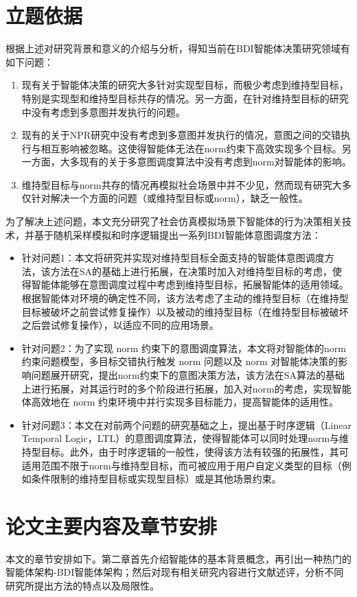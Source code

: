 \section{立题依据}
根据上述对研究背景和意义的介绍与分析，得知当前在BDI智能体决策研究领域有如下问题：
\begin{enumerate}
  \item 现有关于智能体决策的研究大多针对实现型目标，而极少考虑到维持型目标，特别是实现型和维持型目标共存的情况。另一方面，在针对维持型目标的研究中没有考虑到多意图并发执行的问题。
  \item 现有的关于NPR研究中没有考虑到多意图并发执行的情况，意图之间的交错执行与相互影响被忽略。这使得智能体无法在norm约束下高效实现多个目标。另一方面，大多现有的关于多意图调度算法中没有考虑到norm对智能体的影响。
  \item 维持型目标与norm共存的情况再模拟社会场景中并不少见，然而现有研究大多仅针对解决一个方面的问题（或维持型目标或norm），缺乏一般性。
\end{enumerate}

%
为了解决上述问题，本文充分研究了社会仿真模拟场景下智能体的行为决策相关技术，并基于随机采样模拟和时序逻辑提出一系列BDI智能体意图调度方法：
\begin{itemize}
  \item
针对问题1：本文将研究并实现对维持型目标全面支持的智能体意图调度方法，该方法在SA的基础上进行拓展，在决策时加入对维持型目标的考虑，使得智能体能够在意图调度过程中考虑到维持型目标，拓展智能体的适用领域。根据智能体对环境的确定性不同，该方法考虑了主动的维持型目标（在维持型目标被破坏之前尝试修复操作）以及被动的维持型目标（在维持型目标被破坏之后尝试修复操作），以适应不同的应用场景。
  \item
针对问题2：为了实现 norm 约束下的意图调度算法，本文将对智能体的norm约束问题模型，多目标交错执行触发 norm 问题以及 norm 对智能体决策的影响问题展开研究，提出norm约束下的意图决策方法，该方法在SA算法的基础上进行拓展，对其运行时的多个阶段进行拓展，加入对norm的考虑，实现智能体高效地在 norm 约束环境中并行实现多目标能力，提高智能体的适用性。
  \item
针对问题3：本文在对前两个问题的研究基础之上，提出基于时序逻辑（Linear Temporal Logic，LTL）的意图调度算法，使得智能体可以同时处理norm与维持型目标。此外，由于时序逻辑的一般性，使得该方法有较强的拓展性，其可适用范围不限于norm与维持型目标，而可被应用于用户自定义类型的目标（例如条件限制的维持型目标或实现型目标）或是其他场景约束。
\end{itemize}
%
\section{论文主要内容及章节安排}
本文的章节安排如下。第二章首先介绍智能体的基本背景概念，再引出一种热门的智能体架构-BDI智能体架构；然后对现有相关研究内容进行文献述评，分析不同研究所提出方法的特点以及局限性。

